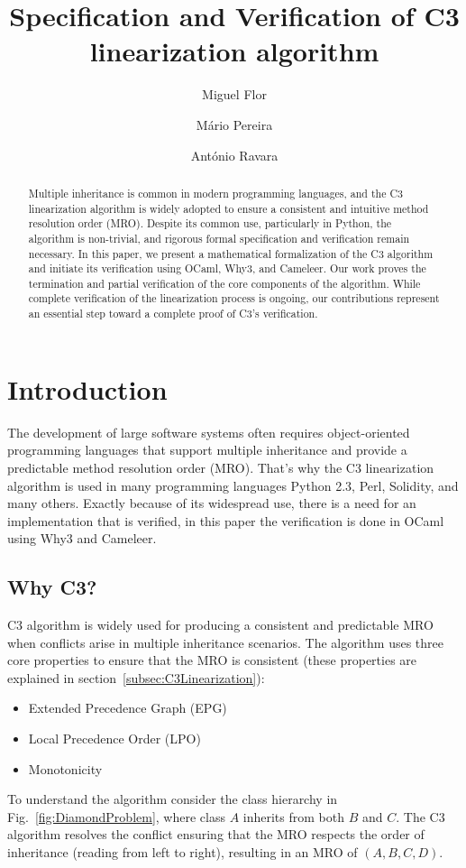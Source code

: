 \documentclass[runningheads]{llncs}
\title{Specification and Verification of C3 linearization algorithm}
\author{
  Miguel Flor \and Mário Pereira \and António Ravara
}
\institute{
  NOVA LINCS, Nova School of Science and Technology \\
  \email{m.flor@campus.fct.unl.pt}, \email{\{mjp.pereira, aravara\}@fct.unl.pt}
}
\begin{document}
\maketitle

\begin{abstract}
Multiple inheritance is common in modern programming languages,
 and the C3 linearization algorithm is widely adopted to ensure a consistent and intuitive method resolution order (MRO). Despite its common use, particularly in Python, the algorithm is non-trivial, and rigorous formal specification and verification remain necessary.
In this paper, we present a mathematical formalization of the C3 algorithm and initiate its verification using OCaml, Why3, and Cameleer. Our work proves the termination and partial verification of the core components of the algorithm.
While complete verification of the linearization process is ongoing, our contributions represent an essential step toward a complete proof of C3's verification.

     
\end{abstract}
\section{Introduction}
The development of large software systems often requires object-oriented programming languages that support multiple inheritance and provide a predictable method resolution order (MRO). 
 That's why the C3 linearization algorithm is used in many programming languages Python 2.3\autocite{Python23Method}, Perl\autocite{MroMethodResolution}, Solidity\autocite{LanguageInfluencesSolidity}, and many others.
 Exactly because of its widespread use, there is a need for an implementation that is verified, in this paper the verification is done in OCaml using Why3 and Cameleer.

\subsection{Why C3?}
C3 algorithm is widely used for producing a consistent and predictable MRO when conflicts arise in multiple inheritance scenarios.
The algorithm uses three core properties to ensure that the MRO is consistent (these properties are explained in section~\ref{subsec:C3Linearization}):
\begin{itemize}
    \item Extended Precedence Graph (EPG)
    \item Local Precedence Order (LPO)
    \item Monotonicity
\end{itemize}
To understand the algorithm consider the class hierarchy in Fig.~\ref{fig:DiamondProblem}, where class $A$ inherits from both $B$ and $C$. The C3 algorithm resolves the conflict ensuring that the MRO respects the order of inheritance (reading from left to right), resulting in an MRO of $(A, B, C, D)$.
\end{document}
